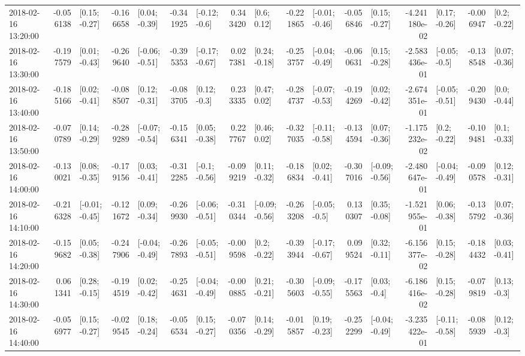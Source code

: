 \begin{tabular}{lrlrlrlrlrlrlrlrl}
2018-02-16 13:20:00 & -0.056138 &   [0.15; -0.27] & -0.166658 &   [0.04; -0.39] & -0.341925 &   [-0.12; -0.6] &  0.343420 &     [0.6; 0.12] & -0.221865 &  [-0.01; -0.46] & -0.056846 &   [0.15; -0.27] & -4.241180e-02 &   [0.17; -0.26] & -0.006947 &    [0.2; -0.22] \\
2018-02-16 13:30:00 & -0.197579 &   [0.01; -0.43] & -0.269640 &  [-0.06; -0.51] & -0.395353 &  [-0.17; -0.67] &  0.027381 &   [0.24; -0.18] & -0.253757 &  [-0.04; -0.49] & -0.060631 &   [0.15; -0.28] & -2.583436e-01 &   [-0.05; -0.5] & -0.138548 &   [0.07; -0.36] \\
2018-02-16 13:40:00 & -0.185166 &   [0.02; -0.41] & -0.088507 &   [0.12; -0.31] & -0.083705 &    [0.12; -0.3] &  0.233335 &    [0.47; 0.02] & -0.284737 &  [-0.07; -0.53] & -0.194269 &   [0.02; -0.42] & -2.674351e-01 &  [-0.05; -0.51] & -0.209430 &    [0.0; -0.44] \\
2018-02-16 13:50:00 & -0.070789 &   [0.14; -0.29] & -0.289289 &  [-0.07; -0.54] & -0.156341 &   [0.05; -0.38] &  0.227767 &    [0.46; 0.02] & -0.327035 &  [-0.11; -0.58] & -0.134594 &   [0.07; -0.36] & -1.175232e-02 &    [0.2; -0.22] & -0.109481 &    [0.1; -0.33] \\
2018-02-16 14:00:00 & -0.130021 &   [0.08; -0.35] & -0.179156 &   [0.03; -0.41] & -0.312285 &   [-0.1; -0.56] & -0.099219 &   [0.11; -0.32] & -0.186834 &   [0.02; -0.41] & -0.307016 &  [-0.09; -0.56] & -2.480647e-01 &  [-0.04; -0.49] & -0.090578 &   [0.12; -0.31] \\
2018-02-16 14:10:00 & -0.216328 &  [-0.01; -0.45] & -0.121672 &   [0.09; -0.34] & -0.269930 &  [-0.06; -0.51] & -0.310344 &  [-0.09; -0.56] & -0.263208 &   [-0.05; -0.5] &  0.130307 &   [0.35; -0.08] & -1.521955e-01 &   [0.06; -0.38] & -0.135792 &   [0.07; -0.36] \\
2018-02-16 14:20:00 & -0.159682 &   [0.05; -0.38] & -0.247906 &  [-0.04; -0.49] & -0.267893 &  [-0.05; -0.51] & -0.009598 &    [0.2; -0.22] & -0.393944 &  [-0.17; -0.67] &  0.099524 &   [0.32; -0.11] & -6.156377e-02 &   [0.15; -0.28] & -0.184432 &   [0.03; -0.41] \\
2018-02-16 14:30:00 &  0.061341 &   [0.28; -0.15] & -0.194519 &   [0.02; -0.42] & -0.254631 &  [-0.04; -0.49] & -0.000885 &   [0.21; -0.21] & -0.305603 &  [-0.09; -0.55] & -0.175563 &    [0.03; -0.4] & -6.186416e-02 &   [0.15; -0.28] & -0.079819 &    [0.13; -0.3] \\
2018-02-16 14:40:00 & -0.056977 &   [0.15; -0.27] & -0.029545 &   [0.18; -0.24] & -0.056534 &   [0.15; -0.27] & -0.070356 &   [0.14; -0.29] & -0.015857 &   [0.19; -0.23] & -0.252299 &  [-0.04; -0.49] & -3.235422e-01 &  [-0.11; -0.58] & -0.085939 &    [0.12; -0.3] \\

\end{tabular}
